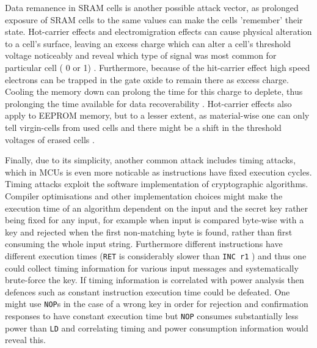 	Data remanence in SRAM cells is another possible attack vector, as prolonged exposure of SRAM cells to the same values can make the cells 'remember' their state. Hot-carrier effects and electromigration effects can cause physical alteration to a cell's surface, leaving an excess charge which can alter a cell's threshold voltage noticeably and reveal which type of signal was most common for particular cell ( 0 or 1) \citep{gutman:memory_remanence}. Furthermore, because of the hit-carrier effect high speed electrons can be trapped in the gate oxide to remain there as excess charge. Cooling the memory down can prolong the time for this charge to deplete, thus prolonging the time available for data recoverability  \citep{gutman:memory_remanence} \citep{sergei:RAM} \citep{sergei:thesis}. Hot-carrier effects also apply to EEPROM memory, but to a lesser extent, as material-wise one can only tell virgin-cells from used cells and there might be a shift in the threshold voltages of erased cells\citep{gutman:memory_remanence} \citep{sergei:thesis}. 
	
	
	Finally, due to its simplicity, another common attack includes timing attacks, which in MCUs is even more noticable as instructions have fixed execution cycles. Timing attacks exploit the software implementation of cryptographic algorithms. Compiler optimisations and other implementation choices might make the execution time of an algorithm dependent on the input and the secret key rather being fixed for any input, for example when input is compared byte-wise with a key and rejected when the first non-matching byte is found, rather than first consuming the whole input string. Furthermore different instructions have different execution times (\texttt{RET} is considerably slower than \texttt{INC r1} \citep{atmega_manual}) and thus one could collect timing information for various input messages and systematically brute-force the key. If timing information is correlated with power analysis then defences such as constant instruction execution time could be defeated. One might use \texttt{NOP}s in the case of a wrong key in order for rejection and confirmation responses to have constant execution time but \texttt{NOP} consumes substantially less power than \texttt{LD} \citep{glitches_paper} and correlating timing and power consumption information would reveal this.

